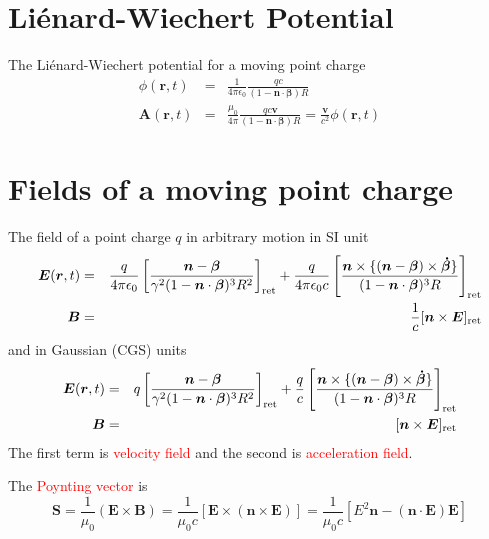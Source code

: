 \documentclass[12pt,a4paper]{article}
\renewcommand{\vec}[1]{\boldsymbol{#1}}
\begin{document}
\section{Li\'{e}nard-Wiechert Potential}
The Li\'{e}nard-Wiechert potential for a moving point charge
\begin{eqnarray}
\phi(\vec{r}, t) &=& \frac{1}{4\pi \epsilon_0} \frac{qc}{(1-\vec{n}\cdot\vec{\beta}) R} \\ 
\vec{A}(\vec{r}, t) &=& \frac{\mu_0}{4\pi} \frac{qc \vec{v}}{(1-\vec{n}\cdot\vec{\beta}) R} = \frac{\vec{v}}{c^2} \phi(\vec{r}, t)
\end{eqnarray}

\section{Fields of a moving point charge}
The field of a point charge $q$ in arbitrary motion in SI unit
\begin{eqnarray}
\vec{E}(\vec{r}, t) &=& \frac{q}{4\pi \epsilon_0} \left[\frac{\vec{n} -\vec{\beta}}{\gamma^2 (1-\vec{n}\cdot\vec{\beta})^3 R^2} \right]_{\rm ret} +\frac{q}{4\pi \epsilon_0 c} \left[\frac{\vec{n} \times \{(\vec{n} -\vec{\beta}) \times \vec{\dot\beta} \}}{(1-\vec{n}\cdot\vec{\beta})^3 R} \right]_{\rm ret} \\
\vec{B}  &=& \frac{1}{c}[\vec{n} \times \vec{E} ]_{\rm ret}
\end{eqnarray}
and in Gaussian (CGS) units
\begin{eqnarray}
\vec{E}(\vec{r}, t) &=& q\left[\frac{\vec{n} -\vec{\beta}}{\gamma^2 (1-\vec{n}\cdot\vec{\beta})^3 R^2} \right]_{\rm ret} +\frac{q}{c} \left[\frac{\vec{n} \times \{(\vec{n} -\vec{\beta}) \times \vec{\dot\beta} \}}{(1-\vec{n}\cdot\vec{\beta})^3 R} \right]_{\rm ret} \\
\vec{B}  &=& [\vec{n} \times \vec{E} ]_{\rm ret}
\end{eqnarray}
The first term is \textcolor{red}{velocity field} and the second is \textcolor{red}{acceleration field}.

The \textcolor{red}{Poynting vector} is
\begin{equation}
\vec{S} = \frac{1}{\mu_0} (\vec{E} \times \vec{B}) = \frac{1}{\mu_0 c} [\vec{E} \times (\vec{n} \times \vec{E})] = \frac{1}{\mu_0 c} [E^2 \vec{n} -(\vec{n}\cdot \vec{E})\vec{E}]
\end{equation}
\end{document}
